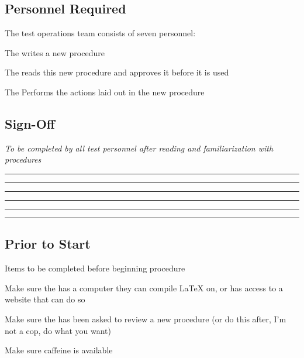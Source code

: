\subsection{Personnel Required}
The test operations team consists of seven personnel:
\begin{checklist}
    \item The \authfull{} writes a new procedure
    \item The \edifull{} reads this new procedure and approves it before it is used
    \item The \perffull{} Performs the actions laid out in the new procedure
\end{checklist}
\setcounter{checklistnum}{0}

\subsection{Sign-Off}
\textit{To be completed by all test personnel after reading and familiarization with procedures}
\begin{checklist}
    \item \authfull      \tabto{25em}\rule{10em}{0.4pt}\hspace{5em}\rule{10em}{0.4pt}
    \item \edifull      \tabto{25em}\rule{10em}{0.4pt}\hspace{5em}\rule{10em}{0.4pt}
    \item \perffull      \tabto{25em}\rule{10em}{0.4pt}\hspace{5em}\rule{10em}{0.4pt}
\end{checklist}
\setcounter{checklistnum}{0}

\subsection{Prior to Start}
\begin{checklist}
    \item Items to be completed before beginning procedure
    \begin{checklist}
        \item Make sure the \auth{} has a computer they can compile \LaTeX{} on, or has access to a website that can do so
        \item Make sure the \edi{} has been asked to review a new procedure (or do this after, I'm not a cop, do what you want)
        \item Make sure caffeine is available
    \end{checklist}
\end{checklist}
\setcounter{checklistnum}{0}

